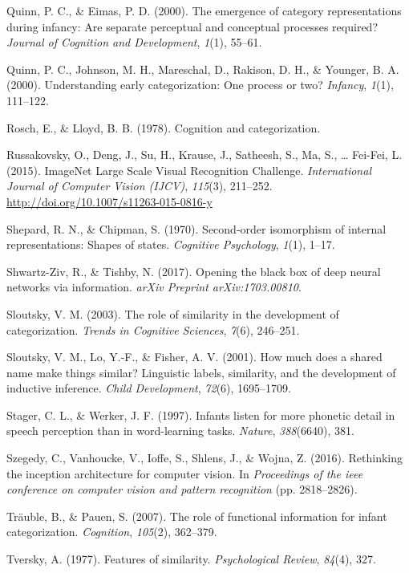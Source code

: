 \documentclass[10pt, letterpaper]{article}
\begin{document}
\hypertarget{ref-quinn2000emergence}{}
Quinn, P. C., \& Eimas, P. D. (2000). The emergence of category
representations during infancy: Are separate perceptual and conceptual
processes required? \emph{Journal of Cognition and Development},
\emph{1}(1), 55--61.

\hypertarget{ref-quinn2000understanding}{}
Quinn, P. C., Johnson, M. H., Mareschal, D., Rakison, D. H., \& Younger,
B. A. (2000). Understanding early categorization: One process or two?
\emph{Infancy}, \emph{1}(1), 111--122.

\hypertarget{ref-rosch1978cognition}{}
Rosch, E., \& Lloyd, B. B. (1978). Cognition and categorization.

\hypertarget{ref-ILSVRC15}{}
Russakovsky, O., Deng, J., Su, H., Krause, J., Satheesh, S., Ma, S.,
\ldots{} Fei-Fei, L. (2015). ImageNet Large Scale Visual Recognition
Challenge. \emph{International Journal of Computer Vision (IJCV)},
\emph{115}(3), 211--252. \url{http://doi.org/10.1007/s11263-015-0816-y}

\hypertarget{ref-shepard1970second}{}
Shepard, R. N., \& Chipman, S. (1970). Second-order isomorphism of
internal representations: Shapes of states. \emph{Cognitive Psychology},
\emph{1}(1), 1--17.

\hypertarget{ref-shwartz2017opening}{}
Shwartz-Ziv, R., \& Tishby, N. (2017). Opening the black box of deep
neural networks via information. \emph{arXiv Preprint arXiv:1703.00810}.

\hypertarget{ref-sloutsky2003role}{}
Sloutsky, V. M. (2003). The role of similarity in the development of
categorization. \emph{Trends in Cognitive Sciences}, \emph{7}(6),
246--251.

\hypertarget{ref-sloutsky2001much}{}
Sloutsky, V. M., Lo, Y.-F., \& Fisher, A. V. (2001). How much does a
shared name make things similar? Linguistic labels, similarity, and the
development of inductive inference. \emph{Child Development},
\emph{72}(6), 1695--1709.

\hypertarget{ref-stager1997infants}{}
Stager, C. L., \& Werker, J. F. (1997). Infants listen for more phonetic
detail in speech perception than in word-learning tasks. \emph{Nature},
\emph{388}(6640), 381.

\hypertarget{ref-szegedy2016rethinking}{}
Szegedy, C., Vanhoucke, V., Ioffe, S., Shlens, J., \& Wojna, Z. (2016).
Rethinking the inception architecture for computer vision. In
\emph{Proceedings of the ieee conference on computer vision and pattern
recognition} (pp. 2818--2826).

\hypertarget{ref-trauble2007role}{}
Träuble, B., \& Pauen, S. (2007). The role of functional information for
infant categorization. \emph{Cognition}, \emph{105}(2), 362--379.

\hypertarget{ref-tversky1977features}{}
Tversky, A. (1977). Features of similarity. \emph{Psychological Review},
\emph{84}(4), 327.
\end{document}
